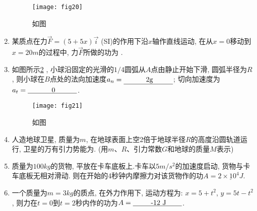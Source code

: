 \begin{enumerate}
    \begin{figure}[H]
        \centering
        \texttt{[image: fig20]}
            \caption{如图}\label{Fig:20}
    \end{figure}
    \item 某质点在力$ \vec{F}=(5+5x)\vec{i}$ (SI)的作用下沿$x$轴作直线运动, 在从$x=0$移动到$x=20m$的过程中, 力$\vec{F}$所做的功为 .
    \item 如图所示\ref{Fig:21} , 小球沿固定的光滑的$1/4$圆弧从$A$点由静止开始下滑, 圆弧半径为$R$, 则小球在$B$点处的法向加速度$a_n = \anl{2g}$; 切向加速度为 $a_t =\anl{0}$. 
    \begin{figure}[H]
        \centering
        \texttt{[image: fig21]}
            \caption{如图}\label{Fig:21}
    \end{figure}
    \item 人造地球卫星, 质量为$m$, 在地球表面上空2倍于地球半径$R$的高度沿圆轨道运行, 卫星的万有引力势能为. (用$m$、$R$、引力常数$G$和地球的质量$M$表示)
    \item 质量为$100kg$的货物, 平放在卡车底板上.卡车以$5m/s^2$的加速度启动, 货物与卡车底板无相对滑动. 则在开始的4秒钟内摩擦力对该货物作的功$A=\underline{2\times 10^4 J }$.
    \item 一个质量为$m=3kg$的质点, 在外力作用下, 运动方程为: $x=5+t^2$, $y=5t-t^2$, 则力在$t=0$到$t=2$秒内作的功为$A = \anl{-12 J}$.
\end{enumerate}
